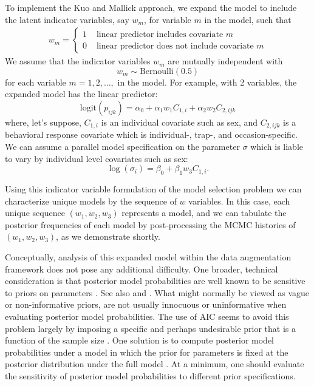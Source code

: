 To implement the Kuo and Mallick approach, we expand the model to
include the latent indicator variables, say $w_{m}$, for variable $m$
in the model, such that
\begin{eqnarray*}
w_{m} = \left\{
\begin{array}{cl} 1 &  \mbox{ linear predictor includes  covariate $m$} \\
                  0 &  \mbox{ linear predictor does not
                                include covariate $m$}
 \end{array}
\right.
\end{eqnarray*}
We assume that the indicator variables $w_{m}$ are mutually
independent with
\[
w_m \sim \mbox{Bernoulli}(0.5)
\]
for each variable $m=1,2,\ldots,$ in the model. For example,
with 2 variables, the 
expanded model has the linear predictor:
\[
\mbox{logit}(p_{ijk}) = \alpha_{0} + \alpha_{1}w_{1} C_{1,i} + \alpha_{2}w_{2} C_{2,ijk}
\]
where, let's suppose, $C_{1,i}$ is an individual covariate such
as sex, and $C_{2,ijk}$ is a behavioral response covariate which is
individual-, trap-, and occasion-specific.  We can assume a parallel
model specification on the parameter $\sigma$ which is liable to vary
by individual level covariates such as sex:
\[
 \log(\sigma_{i}) = \beta_{0} + \beta_{1} w_{3} C_{1,i}.
\]

Using this indicator variable formulation of the model selection
problem we can characterize unique models by the sequence of $w$
variables. In this case, each unique sequence $(w_{1},w_{2},w_{3})$
represents a model, and we can tabulate the posterior frequencies of
each model by post-processing the MCMC histories of
$(w_{1},w_{2},w_{3})$, as we demonstrate shortly.

Conceptually, analysis of this expanded model within the data
augmentation framework does not pose any additional difficulty. One
broader, technical consideration is that posterior model probabilities
are well known to be sensitive to priors on parameters
\citep{aitkin:1991, link_barker:2006}. See also 
\citet[][Sec. 3.4.3]{royle_dorazio:2008} and
\citet[][Sec. 7.2.5]{link_barker:2010}.  What might normally be viewed
as vague or non-informative priors, are not usually innocuous or
uninformative when evaluating posterior model probabilities. The use
of AIC seems to avoid this problem largely by imposing a specific and
perhaps undesirable prior that is a function of the sample size
\citep{kadane_lazar:2004}. One solution is to compute posterior model
probabilities under a model in which the prior for parameters is fixed
at the posterior distribution under the full model
\citep{aitkin:1991}. At a minimum, one should evaluate the sensitivity
of posterior model probabilities to different prior specifications.


